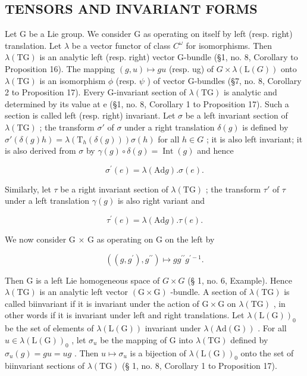 \subsection{TENSORS AND INVARIANT FORMS}

Let G be a Lie group. We consider G as operating on itself by left (resp. right) translation. Let \(\lambda\) be a vector functor of class \(C^{\omega}\) for isomorphisms. Then \(\lambda(\mathrm{TG})\) is an analytic left (resp. right) vector G-bundle (§1, no. 8, Corollary to Proposition 16). The mapping \((g, u) \mapsto gu\) (resp. ug) of \(G \times \lambda(\mathrm{L}(G))\) onto \(\lambda(\mathrm{TG})\) is an isomorphism \(\phi\) (resp. \(\psi\) ) of vector G-bundles (§7, no. 8, Corollary 2 to Proposition 17). Every G-invariant section of \(\lambda(\mathrm{TG})\) is analytic and determined by its value at e (§1, no. 8, Corollary 1 to Proposition 17). Such a section is called left (resp. right) invariant. Let \(\sigma\) be a left invariant section of \(\lambda(\mathrm{TG})\) ; the transform \(\sigma'\) of \(\sigma\) under a right translation \(\delta(g)\) is defined by \(\sigma'(\delta(g)h) = \lambda(\mathrm{T}_{h}(\delta(g)))\sigma(h)\) for all \(h \in G\) ; it is also left invariant; it is also derived from \(\sigma\) by \(\gamma(g) \circ \delta(g) = \operatorname{Int}(g)\) and hence

\[
\sigma^ {\prime} (e) = \lambda (\mathrm{Ad} g). \sigma (e).\tag{26}
\]

Similarly, let \(\tau\) be a right invariant section of \(\lambda(\mathrm{TG})\) ; the transform \(\tau'\) of \(\tau\) under a left translation \(\gamma(g)\) is also right variant and

\[
\tau^ {\prime} (e) = \lambda (\mathrm{Ad} g). \tau (e).\tag{27}
\]

We now consider G × G as operating on G on the left by

\[
\left(\left(g, g ^ {\prime}\right), g ^ {\prime \prime}\right) \mapsto g g ^ {\prime \prime} g ^ {\prime - 1}.
\]

Then G is a left Lie homogeneous space of \(G \times G\) (§ 1, no. 6, Example). Hence \(\lambda(\mathrm{TG})\) is an analytic left vector \((\mathrm{G} \times \mathrm{G})\) -bundle. A section of \(\lambda(\mathrm{TG})\) is called biinvariant if it is invariant under the action of \(\mathrm{G} \times \mathrm{G}\) on \(\lambda(\mathrm{TG})\) , in other words if it is invariant under left and right translations. Let \(\lambda(\mathrm{L}(\mathrm{G}))_{0}\) be the set of elements of \(\lambda(\mathrm{L}(\mathrm{G}))\) invariant under \(\lambda(\mathrm{Ad}(\mathrm{G}))\) . For all \(u \in \lambda(\mathrm{L}(\mathrm{G}))_{0}\) , let \(\sigma_{u}\) be the mapping of G into \(\lambda(\mathrm{TG})\) defined by \(\sigma_{u}(g) = gu = ug\) . Then \(u \mapsto \sigma_{u}\) is a bijection of \(\lambda(\mathrm{L}(\mathrm{G}))_{0}\) onto the set of biinvariant sections of \(\lambda(\mathrm{TG})\) (§ 1, no. 8, Corollary 1 to Proposition 17).

